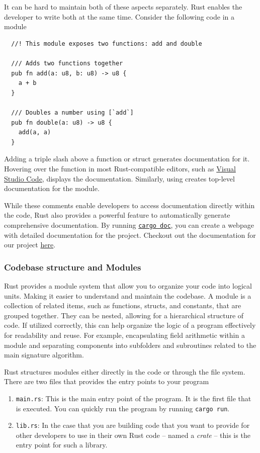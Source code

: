 \documentclass[11pt]{report}
\theoremstyle{definition}
\theoremstyle{plain}
\begin{document}
It can be hard to maintain both of these aspects separately. Rust enables the developer to write both at the same time. Consider the following code in a module

\begin{verbatim}
  //! This module exposes two functions: add and double

  /// Adds two functions together
  pub fn add(a: u8, b: u8) -> u8 { 
    a + b
  }

  /// Doubles a number using [`add`]
  pub fn double(a: u8) -> u8 {
    add(a, a)
  }
\end{verbatim}

Adding a triple slash \rust{///} above a function or struct generates documentation for it. Hovering over the function in most Rust-compatible editors, such as \href{https://code.visualstudio.com/docs/languages/rust}{Visual Studio Code}, displays the documentation. Similarly, using \rust{//!} creates top-level documentation for the module.

While these comments enable developers to access documentation directly within the code, Rust also provides a powerful feature to automatically generate comprehensive documentation. By running \href{https://doc.rust-lang.org/cargo/commands/cargo-doc.html}{\texttt{cargo doc}}, you can create a webpage with detailed documentation for the project. Checkout out the documentation for our project \href{https://mactherobot.github.io/sdith-rust}{here}.

\subsubsection{Codebase structure and Modules}\label{sub:rust_modules}
Rust provides a module system that allow you to organize your code into logical units. Making it easier to understand and maintain the codebase. A module is a collection of related items, such as functions, structs, and constants, that are grouped together. They can be nested, allowing for a hierarchical structure of code.
If utilized correctly, this can help organize the logic of a program effectively for readability and reuse. For example, encapsulating field arithmetic within a module and separating components into subfolders and subroutines related to the main signature algorithm.

Rust structures modules either directly in the code or through the file system. There are two files that provides the entry points to your program
\begin{enumerate}
  \item \texttt{main.rs}: This is the main entry point of the program. It is the first file that is executed. You can quickly run the program by running \texttt{cargo run}.
  \item \texttt{lib.rs}: In the case that you are building code that you want to provide for other developers to use in their own Rust code -- named a \textit{crate} -- this is the entry point for such a library.
\end{enumerate}
\end{document}
